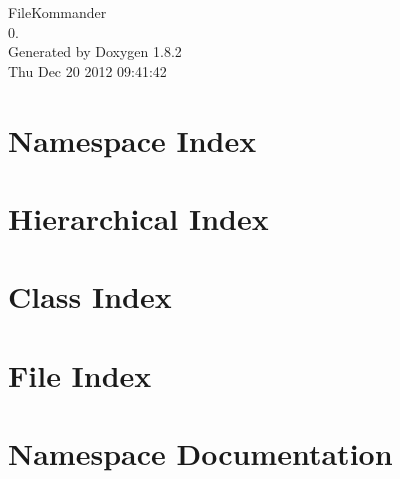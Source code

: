 \documentclass{book}
\begin{document}
\hypersetup{pageanchor=false,citecolor=blue}
\begin{titlepage}
\vspace*{7cm}
\begin{center}
{\Large File\-Kommander \\[1ex]\large 0. }\\
\vspace*{1cm}
{\large Generated by Doxygen 1.8.2}\\
\vspace*{0.5cm}
{\small Thu Dec 20 2012 09:41:42}\\
\end{center}
\end{titlepage}
\clearemptydoublepage
{}
\tableofcontents
\clearemptydoublepage
{}
\hypersetup{pageanchor=true,citecolor=blue}
\chapter{Namespace Index}

\chapter{Hierarchical Index}

\chapter{Class Index}

\chapter{File Index}

\chapter{Namespace Documentation}










\end{document}
